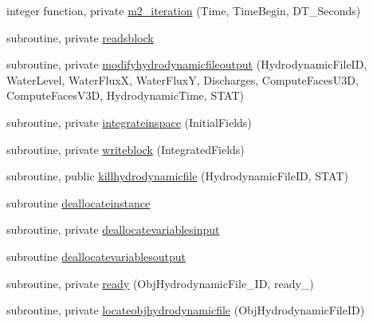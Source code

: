 \begin{DoxyCompactItemize}
\item 
integer function, private \mbox{\hyperlink{namespacemodulehydrodynamicfile_a5a3a54142c84c39924e24d98da9014ae}{m2\+\_\+iteration}} (Time, Time\+Begin, D\+T\+\_\+\+Seconds)
\item 
subroutine, private \mbox{\hyperlink{namespacemodulehydrodynamicfile_a51ac7b78492e92f6633e4889f1a47052}{readsblock}}
\item 
subroutine, private \mbox{\hyperlink{namespacemodulehydrodynamicfile_ab3996472f919cd0d5d57190aa0fca63e}{modifyhydrodynamicfileoutput}} (Hydrodynamic\+File\+ID, Water\+Level, Water\+FluxX, Water\+FluxY, Discharges, Compute\+Faces\+U3D, Compute\+Faces\+V3D, Hydrodynamic\+Time, S\+T\+AT)
\item 
subroutine, private \mbox{\hyperlink{namespacemodulehydrodynamicfile_a567935da3a6ce143ef24e8bb5f4787ea}{integrateinspace}} (Initial\+Fields)
\item 
subroutine, private \mbox{\hyperlink{namespacemodulehydrodynamicfile_a3dc8b494b31e0a9504668b6e7dc8eaa6}{writeblock}} (Integrated\+Fields)
\item 
subroutine, public \mbox{\hyperlink{namespacemodulehydrodynamicfile_a88c5ccf3cef06396cacc97101de6b5ab}{killhydrodynamicfile}} (Hydrodynamic\+File\+ID, S\+T\+AT)
\item 
subroutine \mbox{\hyperlink{namespacemodulehydrodynamicfile_a66415f6a8626e085fe6327e56b6e0438}{deallocateinstance}}
\item 
subroutine, private \mbox{\hyperlink{namespacemodulehydrodynamicfile_a44ff390b68de3bb94294a2fe2d251814}{deallocatevariablesinput}}
\item 
subroutine \mbox{\hyperlink{namespacemodulehydrodynamicfile_aa952fb593bad5ccc173888f38e59a6f8}{deallocatevariablesoutput}}
\item 
subroutine, private \mbox{\hyperlink{namespacemodulehydrodynamicfile_ab74a3df233aec6594db3ce069b1a2c25}{ready}} (Obj\+Hydrodynamic\+File\+\_\+\+ID, ready\+\_\+)
\item 
subroutine, private \mbox{\hyperlink{namespacemodulehydrodynamicfile_aa662fd4d0a1262940a320a6801dbe247}{locateobjhydrodynamicfile}} (Obj\+Hydrodynamic\+File\+ID)
\end{DoxyCompactItemize}
